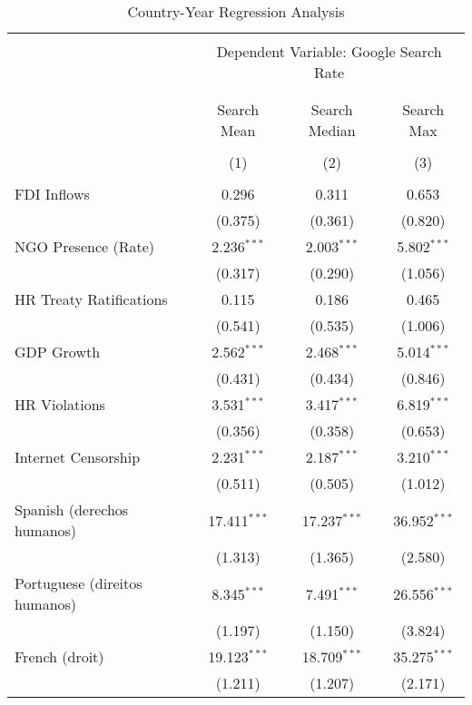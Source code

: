 
\begin{table}[!htbp] \centering 
  \caption{Country-Year Regression Analysis} 
  \label{} 
\begin{tabular}{@{\extracolsep{5pt}}lccc} 
\\[-1.8ex]\hline 
\hline \\[-1.8ex] 
 & \multicolumn{3}{c}{Dependent Variable: Google Search Rate} \\ 
\cline{2-4} 
\\[-1.8ex] & \multicolumn{3}{c}{ } \\ 
 & Search Mean & Search Median & Search Max \\ 
\\[-1.8ex] & (1) & (2) & (3)\\ 
\hline \\[-1.8ex] 
 FDI Inflows & 0.296 & 0.311 & 0.653 \\ 
  & (0.375) & (0.361) & (0.820) \\ 
  NGO Presence (Rate) & 2.236$^{***}$ & 2.003$^{***}$ & 5.802$^{***}$ \\ 
  & (0.317) & (0.290) & (1.056) \\ 
  HR Treaty Ratifications & 0.115 & 0.186 & 0.465 \\ 
  & (0.541) & (0.535) & (1.006) \\ 
  GDP Growth & 2.562$^{***}$ & 2.468$^{***}$ & 5.014$^{***}$ \\ 
  & (0.431) & (0.434) & (0.846) \\ 
  HR Violations & 3.531$^{***}$ & 3.417$^{***}$ & 6.819$^{***}$ \\ 
  & (0.356) & (0.358) & (0.653) \\ 
  Internet Censorship & 2.231$^{***}$ & 2.187$^{***}$ & 3.210$^{***}$ \\ 
  & (0.511) & (0.505) & (1.012) \\ 
  Spanish (derechos humanos) & 17.411$^{***}$ & 17.237$^{***}$ & 36.952$^{***}$ \\ 
  & (1.313) & (1.365) & (2.580) \\ 
  Portuguese (direitos humanos) & 8.345$^{***}$ & 7.491$^{***}$ & 26.556$^{***}$ \\ 
  & (1.197) & (1.150) & (3.824) \\ 
  French (droit) & 19.123$^{***}$ & 18.709$^{***}$ & 35.275$^{***}$ \\ 
  & (1.211) & (1.207) & (2.171) \\ 

\end{tabular}
\end{table}
